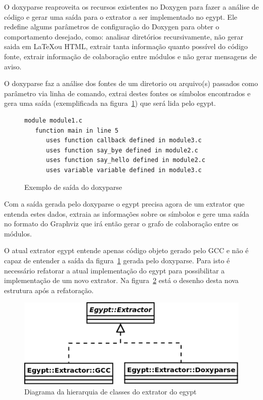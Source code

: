 O doxyparse reaproveita os recursos existentes no Doxygen para fazer a
análise de código e gerar uma saída para o extrator a ser implementado no
egypt. Ele redefine algums parâmetros de configuração do Doxygen para obter o
comportamento desejado, como: analisar diretórios recursivamente, não gerar
saida em \LaTeX ou HTML, extrair tanta informação quanto possível do código
fonte, extrair informação de colaboração entre módulos e não gerar mensagens de
aviso.

O doxyparse faz a análise dos fontes de um diretorio ou arquivo(s) passados
como parâmetro via linha de comando, extrai destes fontes os símbolos
encontrados e gera uma saída (exemplificada na
figura~\ref{exemplo-saida-doxyparse}) que será lida pelo egypt.

\begin{figure}[h]
\begin{Verbatim}[frame=single,fontsize=\relsize{-2},fontfamily=courier]
module module1.c
   function main in line 5
      uses function callback defined in module3.c
      uses function say_bye defined in module2.c
      uses function say_hello defined in module2.c
      uses variable variable defined in module3.c
\end{Verbatim}
\caption{Exemplo de saída do doxyparse}
\label{exemplo-saida-doxyparse}
\end{figure}

Com a saída gerada pelo doxyparse o egypt precisa agora de um extrator que
entenda estes dados, extraia as informações sobre os símbolos e gere uma saída no
formato do Graphviz que irá então gerar o grafo de colaboração entre os módulos.

O atual extrator egypt entende apenas código objeto gerado pelo GCC e não é
capaz de entender a saída da figura~\ref{exemplo-saida-doxyparse} gerada pelo
doxyparse. Para isto é necessário refatorar a atual implementação do egypt para
possibilitar a implementação de um novo extrator. Na
figura~\ref{egypt-diagram-extractor} está o desenho desta nova estrutura após a
refatoração.

\begin{figure}[h]
\center
\includegraphics[scale=0.4]{imagens/egypt-diagram-extractor}
\caption{Diagrama da hierarquia de classes do extrator do egypt}
\label{egypt-diagram-extractor}
\end{figure}

